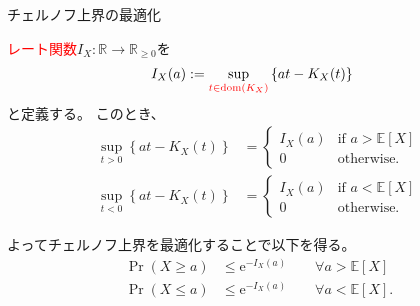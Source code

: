 \documentclass[lualatex,handout]{beamer}
\newcommand{\emm}[1]{\textcolor{red}{#1}}
\newcommand{\expt}[1]{\mathbb{E}\left[#1\right]}
\theoremstyle{definition}
\begin{document}
\begin{frame}{チェルノフ上界の最適化}
\begin{lemma}
\emm{レート関数}$I_X\colon\mathbb{R}\to\mathbb{R}_{\ge 0}$を
\begin{align*}
I_X(a) &:= \sup_{\emm{t \in\mathrm{dom}(K_X)}}\left\{at - K_X(t)\right\}
\end{align*}
と定義する。
このとき、
\begin{align*}
\sup_{t>0}\left\{at-K_X(t)\right\}&=\begin{cases}
I_X(a)&\text{if } a > \expt{X}\\
0&\text{otherwise.}
\end{cases}\\
\sup_{t<0}\left\{at-K_X(t)\right\}&=\begin{cases}
I_X(a)&\text{if } a < \expt{X}\\
0&\text{otherwise.}
\end{cases}
\end{align*}
\end{lemma}
よってチェルノフ上界を最適化することで以下を得る。
\begin{align*}
\Pr\left(X\ge a\right) &\le \mathrm{e}^{-I_X(a)}\qquad\forall a>\expt{X}\\
\Pr\left(X\le a\right) &\le \mathrm{e}^{-I_X(a)}\qquad\forall a<\expt{X}.
\end{align*}
\end{frame}
\end{document}
